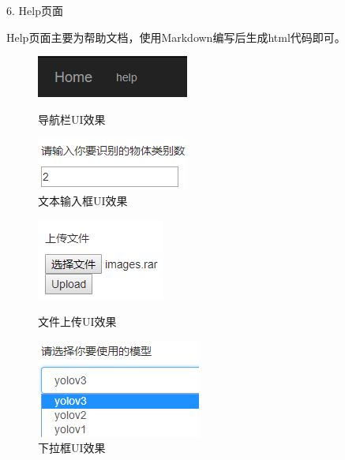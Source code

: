 6. Help页面

Help页面主要为帮助文档，使用Markdown编写后生成html代码即可。

\begin{figure}[h]
    \begin{minipage}[t]{0.45\textwidth}
        \centering
        \includegraphics{pic/chap4/topbar_ui.png}
        \caption{导航栏UI效果}
        \label{fig:topbar_ui}
    \end{minipage}
    \begin{minipage}[t]{0.45\textwidth}
        \centering
        \includegraphics{pic/chap4/input_ui.png}
        \caption{文本输入框UI效果}
        \label{fig:input_ui}
    \end{minipage}
\end{figure}

\begin{figure}[h]
    \begin{minipage}[t]{0.45\textwidth}
        \centering
        \includegraphics{pic/chap4/upload_ui.png}
        \caption{文件上传UI效果}
        \label{fig:upload_ui}
    \end{minipage}
    \begin{minipage}[t]{0.45\textwidth}
        \centering
        \includegraphics{pic/chap4/model_ui.png}
        \caption{下拉框UI效果}
        \label{fig:model_ui}
    \end{minipage}
\end{figure}

